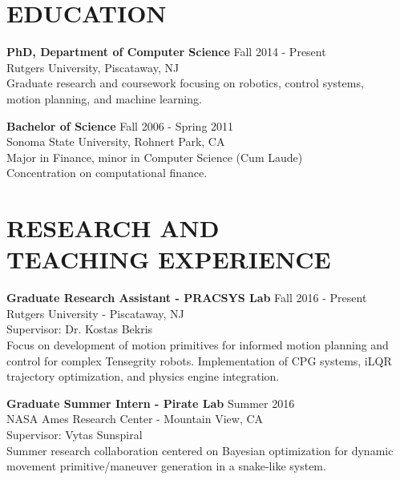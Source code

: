 \documentclass[margin, 10pt]{res} %
\begin{document}
\begin{resume}


\section{EDUCATION}

{\bf PhD, Department of Computer Science}  \hfill Fall 2014 - Present \\
Rutgers University, Piscataway, NJ\\
Graduate research and coursework focusing on robotics, control systems,\\ motion planning, and machine learning.

{\bf Bachelor of Science }  \hfill Fall 2006 - Spring 2011 \\
Sonoma State University, Rohnert Park, CA\\
Major in Finance, minor in Computer Science (Cum Laude)\\
Concentration on computational finance.
 
 
\section{RESEARCH AND \\TEACHING EXPERIENCE}

{\bf Graduate Research Assistant - PRACSYS Lab} \hfill Fall 2016 - Present \\
Rutgers University - Piscataway, NJ\\
Supervisor: Dr. Kostas Bekris\\
Focus on development of motion primitives for informed motion planning and control for complex Tensegrity robots. Implementation of CPG systems, iLQR trajectory optimization, and physics engine integration. 

{\bf Graduate Summer Intern - Pirate Lab} \hfill Summer 2016\\
NASA Ames Research Center - Mountain View, CA\\
Supervisor: Vytas Sunspiral\\
Summer research collaboration centered on Bayesian optimization for dynamic movement primitive/maneuver generation in a snake-like system.


\end{resume}
\end{document}
